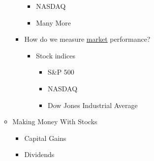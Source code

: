 \documentclass[12pt]{article}
\begin{document}
\begin{enumerate}
\begin{itemize}
\begin{itemize}
\begin{itemize}
              \item NASDAQ

              \item Many More

            \end{itemize}

          \item How do we measure \underline{market} performance?

            \begin{itemize}

              \item Stock indices

                \begin{itemize}

                  \item S\&P 500

                  \item NASDAQ

                  \item Dow Jones Industrial Average

                \end{itemize}

            \end{itemize}

        \end{itemize}

      \item Making Money With Stocks

        \begin{itemize}

          \item Capital Gains

          \item Dividends

        \end{itemize}

    \end{itemize}

\end{enumerate}
\end{document}
